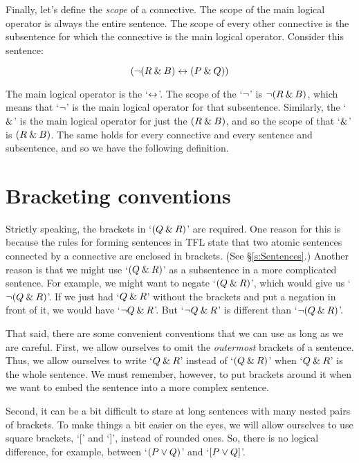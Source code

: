 Finally, let's define the \emph{scope} of a connective. The scope of the main logical operator is always the entire sentence. The scope of every other connective is the subsentence for which the connective is the main logical operator. Consider this sentence:

$$({\neg}(R \mathbin{\&} B) \leftrightarrow (P \mathbin{\&} Q))$$

The main logical operator is the `$\leftrightarrow$'. The scope of the `${\neg}$' is ${\neg}(R \mathbin{\&} B)$, which means that `${\neg}$' is the main logical operator for that subsentence. Similarly, the `$\mathbin{\&}$' is the main logical operator for just the $(R \mathbin{\&} B)$, and so the scope of that `$\mathbin{\&}$' is $(R \mathbin{\&} B)$. The same holds for every connective and every sentence and subsentence, and so we have the following definition.



\section{Bracketing conventions}
\label{TFLconventions}
Strictly speaking, the brackets in `$(Q \mathbin{\&} R)$' are required. One reason for this is because the rules for forming sentences in TFL state that two atomic sentences connected by a connective are enclosed in brackets. (See \S\ref{s:Sentences}.) Another reason is that we might use `$(Q \mathbin{\&} R)$' as a subsentence in a more complicated sentence. For example, we might want to negate `$(Q \mathbin{\&} R)$', which would give us `${\neg}(Q \mathbin{\&} R)$'. If we just had `$Q \mathbin{\&} R$' without the brackets and put a negation in front of it, we would have `${\neg} Q \mathbin{\&} R$'. But `${\neg} Q \mathbin{\&} R$' is different than `${\neg}(Q\mathbin{\&} R)$'. 

That said, there are some convenient conventions that we can use as long as we are careful. First,  we allow ourselves to omit the \emph{outermost} brackets of a sentence. Thus, we allow ourselves to write `$Q \mathbin{\&} R$' instead of `$(Q \mathbin{\&} R)$' when `$Q \mathbin{\&} R$' is the whole sentence. We must remember, however, to put brackets around it when we want to embed the sentence into a more complex sentence.

Second, it can be a bit difficult to stare at long sentences with many nested pairs of brackets. To make things a bit easier on the eyes, we will allow ourselves to use square brackets, `[' and `]', instead of rounded ones. So, there is no logical difference, for example, between `$(P\vee Q)$' and `$[P\vee Q]$'. 

